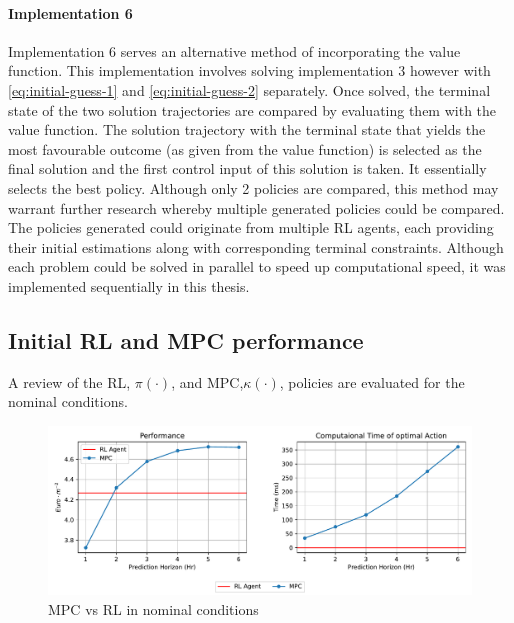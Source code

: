 \paragraph{Implementation 6}
Implementation 6 serves an alternative method of incorporating the value function. This implementation involves solving implementation 3 however with \autoref{eq:initial-guess-1} and \autoref{eq:initial-guess-2} separately. Once solved, the terminal state of the two solution trajectories are compared by evaluating them with the value function. The solution trajectory with the terminal state that yields the most favourable outcome (as given from the value function) is selected as the final solution and the first control input of this solution is taken. It essentially selects the best policy. Although only 2 policies are compared, this method may warrant further research whereby multiple generated policies could be compared. The policies generated could originate from multiple RL agents, each providing their initial estimations along with corresponding terminal constraints. Although each problem could be solved in parallel to speed up computational speed, it was implemented sequentially in this thesis.



\subsection{Initial RL and MPC performance}
A review of the RL, $\pi(\cdot)$, and MPC,$\kappa(\cdot)$, policies are evaluated for the nominal conditions.


\begin{figure}[H]
	\centering
	\includegraphics[width=\textwidth]{figures/mpc_vs_rl_nominal.pdf}
	\caption{MPC vs RL in nominal conditions}
	\label{fig:rl-vs-mpc-nominal}
\end{figure}


